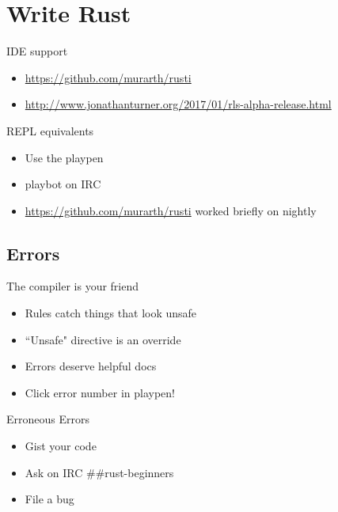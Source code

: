 \documentclass[50pt]{beamer}
\begin{document}
\section{Write Rust}

\begin{frame}
    IDE support
    \begin{itemize}
        \item \url{https://github.com/murarth/rusti}
        \item \url{http://www.jonathanturner.org/2017/01/rls-alpha-release.html}
    \end{itemize}
\end{frame}

\begin{frame}
    REPL equivalents
    \begin{itemize}
        \item Use the playpen
        \item playbot on IRC
        \item \url{https://github.com/murarth/rusti} worked briefly on nightly
    \end{itemize}
\end{frame}


\subsection{Errors}

\begin{frame}
    The compiler is your friend
    \begin{itemize}
        \item Rules catch things that look unsafe
        \item ``Unsafe" directive is an override
        \item Errors deserve helpful docs
        \item Click error number in playpen!
    \end{itemize}
\end{frame}

\begin{frame}
    Erroneous Errors
    \begin{itemize}
        \item Gist your code
        \item Ask on IRC \#\#rust-beginners
        \item File a bug
    \end{itemize}
\end{frame}
\end{document}
